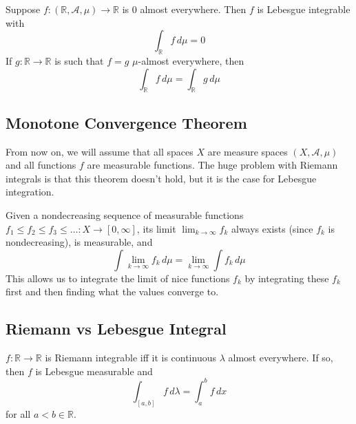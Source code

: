  \begin{theorem}
    Suppose $f: (\mathbb{R}, \mathcal{A}, \mu) \longrightarrow \mathbb{R}$ is $0$ almost everywhere. Then $f$ is Lebesgue integrable with 
    \begin{equation}
      \int_\mathbb{R} f \, d\mu = 0 
    \end{equation}
    If $g: \mathbb{R} \longrightarrow \mathbb{R}$ is such that $f = g$ $\mu$-almost everywhere, then
    \begin{equation}
      \int_\mathbb{R} f\, d\mu = \int_\mathbb{R} g \, d\mu
    \end{equation}
  \end{theorem}

\subsection{Monotone Convergence Theorem}

  From now on, we will assume that all spaces $X$ are measure spaces $(X, \mathcal{A}, \mu)$ and all functions $f$ are measurable functions. The huge problem with Riemann integrals is that this theorem doesn't hold, but it is the case for Lebesgue integration. 

  \begin{theorem}
    Given a nondecreasing sequence of measurable functions $f_1 \leq f_2 \leq f_3 \leq \ldots : X \longrightarrow [0, \infty]$, its limit $\lim_{k \rightarrow \infty} f_k$ always exists (since $f_k$ is nondecreasing), is measurable, and 
    \begin{equation}
      \int \lim_{k \rightarrow \infty} f_k \, d\mu = \lim_{k \rightarrow \infty} \int f_k \, d\mu
    \end{equation}
    This allows us to integrate the limit of nice functions $f_k$ by integrating these $f_k$ first and then finding what the values converge to. 
  \end{theorem}

\subsection{Riemann vs Lebesgue Integral}

  \begin{theorem}
    $f: \mathbb{R} \longrightarrow \mathbb{R}$ is Riemann integrable iff it is continuous $\lambda$ almost everywhere. If so, then $f$ is Lebesgue measurable and 
    \begin{equation}
      \int_{[a, b]} f \,d\lambda = \int_a^b f \, dx
    \end{equation}
    for all $a < b \in \mathbb{R}$. 
  \end{theorem}


